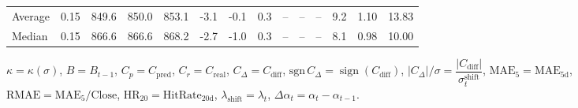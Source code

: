 \begin{threeparttable}
{\begin{tabular}{lrrrrrrrrrrrrr}
Average &     0.15 & 849.6 & 850.0 & 853.1 &       -3.1 &                     -0.1 &                 0.3 &         -- &        -- &             -- &              9.2 &            1.10 &                  13.83 \\
 Median &     0.15 & 866.6 & 866.6 & 868.2 &       -2.7 &                     -1.0 &                 0.3 &         -- &        -- &             -- &              8.1 &            0.98 &                  10.00 \\
\bottomrule
\end{tabular}
}
\begin{tablenotes}\footnotesize
\item $\kappa=\kappa(\sigma)$, $B=B_{t-1}$, $C_p=C_{\text{pred}}$, $C_r=C_{\text{real}}$, $C_\Delta=C_{\text{diff}}$, $\mathrm{sgn}\,C_\Delta=\operatorname{sign}(C_{\text{diff}})$, $|C_\Delta|/\sigma=\dfrac{|C_{\text{diff}}|}{\sigma_t^{\text{shift}}}$, $\mathrm{MAE}_5=\mathrm{MAE}_{5\text{d}}$, $\mathrm{RMAE}= \mathrm{MAE}_5 / \text{Close}$, $\mathrm{HR}_{20}=\mathrm{HitRate}_{20\text{d}}$, 
$\lambda_{\text{shift}}=\lambda_t$, 
$\Delta\alpha_t=\alpha_t-\alpha_{t-1}$.
\end{tablenotes}
\end{threeparttable}
\endgroup

